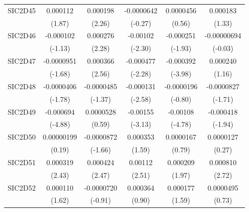\begin{table}[htbp]
\begin{tabular}{l*{5}{c}}
SIC2D45     &    0.000112         &    0.000198\sym{*}  &  -0.0000642         &   0.0000456         &    0.000183         \\
            &      (1.87)         &      (2.26)         &     (-0.27)         &      (0.56)         &      (1.33)         \\
SIC2D46     &   -0.000102         &    0.000276\sym{*}  &    -0.00102\sym{*}  &   -0.000251         & -0.00000694         \\
            &     (-1.13)         &      (2.28)         &     (-2.30)         &     (-1.93)         &     (-0.03)         \\
SIC2D47     &  -0.0000951         &    0.000366\sym{*}  &   -0.000477\sym{*}  &   -0.000392\sym{***}&    0.000240         \\
            &     (-1.68)         &      (2.56)         &     (-2.28)         &     (-3.98)         &      (1.16)         \\
SIC2D48     &  -0.0000406         &  -0.0000485         &   -0.000131\sym{**} &  -0.0000196         &  -0.0000827         \\
            &     (-1.78)         &     (-1.37)         &     (-2.58)         &     (-0.80)         &     (-1.71)         \\
SIC2D49     &   -0.000694\sym{***}&   0.0000528         &    -0.00155\sym{**} &    -0.00108\sym{***}&   -0.000418         \\
            &     (-4.88)         &      (0.59)         &     (-3.13)         &     (-4.78)         &     (-1.94)         \\
SIC2D50     &  0.00000199         &  -0.0000872         &    0.000353         &   0.0000167         &   0.0000127         \\
            &      (0.19)         &     (-1.66)         &      (1.59)         &      (0.79)         &      (0.27)         \\
SIC2D51     &    0.000319\sym{*}  &    0.000424\sym{*}  &     0.00112\sym{*}  &    0.000209\sym{*}  &    0.000810\sym{**} \\
            &      (2.43)         &      (2.47)         &      (2.51)         &      (1.97)         &      (2.72)         \\
SIC2D52     &    0.000110         &  -0.0000720         &    0.000364         &    0.000177         &   0.0000495         \\
            &      (1.62)         &     (-0.91)         &      (0.90)         &      (1.59)         &      (0.73)         \\

\end{tabular}
\end{table}
